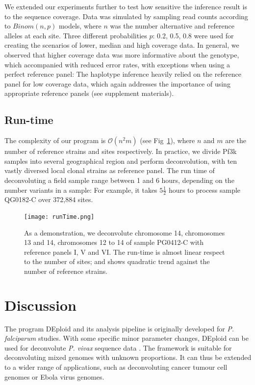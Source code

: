 \documentclass{bioinfo}
\begin{document}
We extended our experiments further to test how sensitive the inference result is to the sequence coverage. Data was simulated by sampling read counts according to $Binom(n,p)$ models, where $n$ was the number alternative and reference alleles at each site. Three different probabilities $p$: 0.2, 0.5, 0.8 were used for creating the scenarios of lower, median and high coverage data. In general, we observed that higher coverage data was more informative about the genotype, which accompanied with reduced error rates, with exceptions when using a perfect reference panel: The haplotype inference heavily relied on the reference panel for low coverage data, which again addresses the importance of using appropriate reference panels (see supplement materials).



\subsection{Run-time}
The complexity of our program is $\mathcal{O}(n^2m)$ (see Fig~\ref{fig:runtime}), where $n$ and $m$ are the number of reference strains and sites respectively. In practice, we divide Pf3k samples into several geographical region and perform deconvolution, with ten vastly diversed local clonal strains as reference panel. The run time of deconvoluting a field sample range between 1 and 6 hours, depending on the number variants in a sample: For example, it takes $5\frac{1}{2}$ hours to process sample {\textmd QG0182-C} over 372,884 sites.


\begin{figure}[ht]
\centering
\texttt{[image: runTime.png]}
\caption{As a demonstration, we deconvolute chromosome 14, chromosomes 13 and 14, chromosomes 12 to 14 of sample {\textmd PG0412-C} with reference panels I, V and VI. The run-time is almost linear respect to the number of sites; and shows quadratic trend against the number of reference strains.}\label{fig:runtime}
\end{figure}



\section{Discussion}
The program DEploid and its analysis pipeline is originally developed for {\it P. falciparum} studies. With some specific minor parameter changes, DEploid can be used for deconvolute {\it P. vivax} sequence data \citep{Pearson2016}. The framework is suitable for deconvoluting mixed genomes with unknown proportions. It can thus be extended to a wider range of applications, such as deconvoluting cancer tumour cell genomes or Ebola virus genomes.
\end{document}

